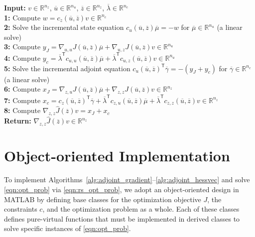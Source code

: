 \documentclass{article}
\def\R{{\mathbb R}}
\newcommand{\trp}{^{\mathsf{T}}}
\begin{document}
\begin{algorithm}[H]
\caption{Adjoint-based Hessian-vector product calculation}
\label{alg:adjoint_hessvec}
    \textbf{Input: } $v\in\R^{n_{z}}$, $\overline{u}\in\R^{n_{u}}$, $\overline{z}\in\R^{n_{z}}$, $\overline{\lambda}\in\R^{n_{c}}$
    \\
    \textbf{1: } Compute $w = c_z(\overline{u},\overline{z}) v \in\R^{n_{c}}$
    \\
    \textbf{2: } Solve the incremental state equation $c_u(\overline{u},\overline{z}) \overline{\mu} = - w$ for $\overline{\mu} \in \R^{n_{u}}$ (a linear solve)
    \\
    \textbf{3: } Compute $y_J = \nabla_{u,u} J(\overline{u},\overline{z}) \overline{\mu} + \nabla_{u,z} J(\overline{u},\overline{z}) v \in \R^{n_{u}}$
    \\
    \textbf{4: } Compute $y_c = \overline{\lambda}\trp c_{u,u}(\overline{u},\overline{z}) \overline{\mu} +  \overline{\lambda}\trp c_{u,z}(\overline{u},\overline{z}) v \in \R^{n_{u}}$
    \\
    \textbf{5: } Solve the incremental adjoint equation $c_u(\overline{u},\overline{z})\trp \overline{\gamma} = -(y_J + y_c)$ for $\overline{\gamma} \in \R^{n_{c}}$ (a linear solve)
    \\
    \textbf{6: } Compute $x_J= \nabla_{z,u}J(\overline{u},\overline{z}) \overline{\mu} +  \nabla_{z,z}J(\overline{u},\overline{z}) v \in \R^{n_{z}}$
    \\
    \textbf{7: } Compute $x_c = c_z(\overline{u},\overline{z})\trp \overline{\gamma} + \overline{\lambda}\trp c_{z,u}(\overline{u},\overline{z}) \overline{\mu} + \overline{\lambda}\trp c_{z,z}(\overline{u},\overline{z})v \in\R^{n_{z}}$
    \\
    \textbf{8: } Compute $\nabla_{z,z} \hat{J}(\overline{z}) v = x_J + x_c$
    \\
    \textbf{Return: } $\nabla_{z,z} \hat{J}(\overline{z}) v \in \R^{n_{z}}$
\end{algorithm}

\section*{Object-oriented Implementation}

To implement Algorithms~\ref{alg:adjoint_gradient}--\ref{alg:adjoint_hessvec} and solve \eqref{eqn:opt_prob} via \eqref{eqn:rs_opt_prob}, we adopt an object-oriented design in MATLAB by defining base classes for the optimization objective $J$, the constraints $c$, and the optimization problem as a whole.
Each of these classes defines pure-virtual functions that must be implemented in derived classes to solve specific instances of \eqref{eqn:opt_prob}.
\end{document}
